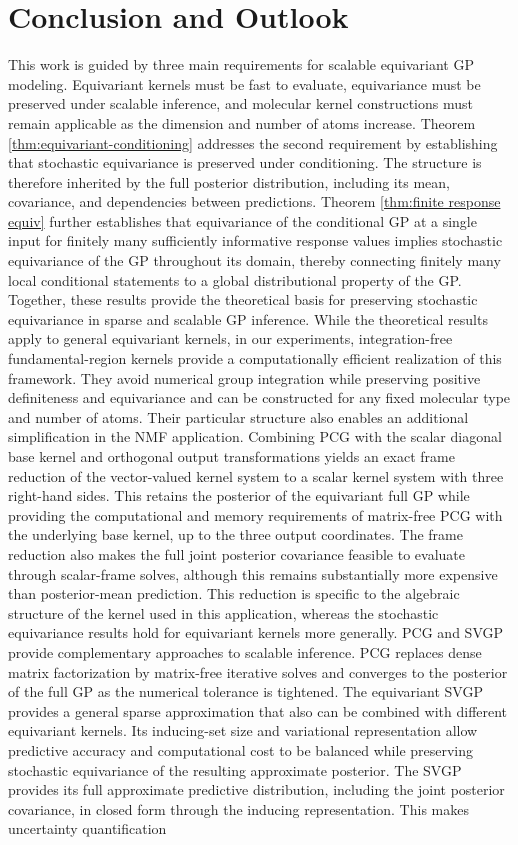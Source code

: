 \documentclass[11pt,a4paper]{article}
\begin{document}
\section{Conclusion and Outlook}
\label{sec:discussion}
This work is guided by three main requirements for scalable equivariant GP modeling. Equivariant kernels must be fast to evaluate, equivariance must be preserved under scalable inference, and molecular kernel constructions must remain applicable as the dimension and number of atoms increase. Theorem \ref{thm:equivariant-conditioning} addresses the second requirement by establishing that stochastic equivariance is preserved under conditioning. The structure is therefore inherited by the full posterior distribution, including its mean, covariance, and dependencies between predictions. Theorem \ref{thm:finite response equiv} further establishes that equivariance of the conditional GP at a single input for finitely many sufficiently informative response values implies stochastic equivariance of the GP throughout its domain, thereby connecting finitely many local conditional statements to a global distributional property of the GP. Together, these results provide the theoretical basis for preserving stochastic equivariance in sparse and scalable GP inference. While the theoretical results apply to general equivariant kernels, in our experiments, integration-free fundamental-region kernels provide a computationally efficient realization of this framework. They avoid numerical group integration while preserving positive definiteness and equivariance and can be constructed for any fixed molecular type and number of atoms. Their particular structure also enables an additional simplification in the NMF application. Combining PCG with the scalar diagonal base kernel and orthogonal output transformations yields an exact frame reduction of the vector-valued kernel system to a scalar kernel system with three right-hand sides. This retains the posterior of the equivariant full GP while providing the computational and memory requirements of matrix-free PCG with the underlying base kernel, up to the three output coordinates. The frame reduction also makes the full joint posterior covariance feasible to evaluate through scalar-frame solves, although this remains substantially more expensive than posterior-mean prediction. This reduction is specific to the algebraic structure of the kernel used in this application, whereas the stochastic equivariance results hold for equivariant kernels more generally. PCG and SVGP provide complementary approaches to scalable inference. PCG replaces dense matrix factorization by matrix-free iterative solves and converges to the posterior of the full GP as the numerical tolerance is tightened. The equivariant SVGP provides a general sparse approximation that also can be combined with different equivariant kernels. Its inducing-set size and variational representation allow predictive accuracy and computational cost to be balanced while preserving stochastic equivariance of the resulting approximate posterior. The SVGP provides its full approximate predictive distribution, including the joint posterior covariance, in closed form through the inducing representation. This makes uncertainty quantification 
\end{document}
